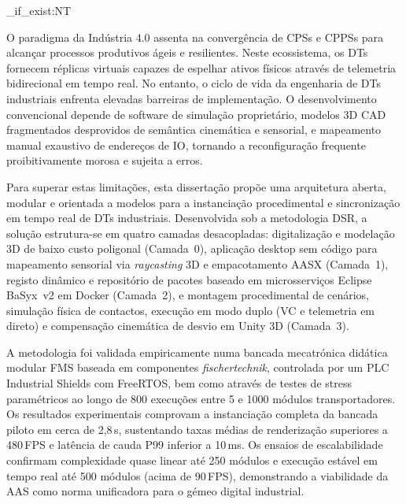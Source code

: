 
\ExplSyntaxOn
\cs_if_exist:NT \TitleOnHeader
  { \TitleOnHeader }
\ExplSyntaxOff

%

O paradigma da Indústria 4.0 assenta na convergência de \glspl{CPS} e \glspl{CPPS} para alcançar processos produtivos ágeis e resilientes. Neste ecossistema, os \glspl{DT} fornecem réplicas virtuais capazes de espelhar ativos físicos através de telemetria bidirecional em tempo real. No entanto, o ciclo de vida da engenharia de \glspl{DT} industriais enfrenta elevadas barreiras de implementação. O desenvolvimento convencional depende de software de simulação proprietário, modelos 3D \gls{CAD} fragmentados desprovidos de semântica cinemática e sensorial, e mapeamento manual exaustivo de endereços de \gls{IO}, tornando a reconfiguração frequente proibitivamente morosa e sujeita a erros.

Para superar estas limitações, esta dissertação propõe uma arquitetura aberta, modular e orientada a modelos para a instanciação procedimental e sincronização em tempo real de \glspl{DT} industriais. Desenvolvida sob a metodologia \gls{DSR}, a solução estrutura-se em quatro camadas desacopladas: digitalização e modelação 3D de baixo custo poligonal (Camada~0), aplicação desktop sem código para mapeamento sensorial via \textit{raycasting} 3D e empacotamento \gls{AASX} (Camada~1), registo dinâmico e repositório de pacotes baseado em microsserviços Eclipse BaSyx~v2 em Docker (Camada~2), e montagem procedimental de cenários, simulação física de contactos, execução em modo duplo (\gls{VC} e telemetria em direto) e compensação cinemática de desvio em Unity 3D (Camada~3).

A metodologia foi validada empiricamente numa bancada mecatrónica didática modular \gls{FMS} baseada em componentes \textit{fischertechnik}, controlada por um \gls{PLC} Industrial Shields com FreeRTOS, bem como através de testes de stress paramétricos ao longo de 800 execuções entre 5 e 1000 módulos transportadores. Os resultados experimentais comprovam a instanciação completa da bancada piloto em cerca de 2{,}8\,s, sustentando taxas médias de renderização superiores a 480\,\gls{FPS} e latência de cauda P99 inferior a 10\,ms. Os ensaios de escalabilidade confirmam complexidade quase linear até 250 módulos e execução estável em tempo real até 500 módulos (acima de 90\,\gls{FPS}), demonstrando a viabilidade da \gls{AAS} como norma unificadora para o gémeo digital industrial.

